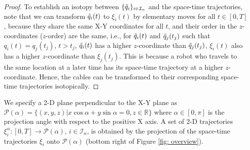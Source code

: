 \documentclass[conference]{IEEEtran}
\newcommand*{\myset}[1]{\mathcal{#1}} %
\newcommand*{\rone}{\mathbb{R}}
\newcommand*{\robpath}{q} %
\newcommand*{\ra}{\rightarrow} %
\newcommand*{\timet}{T} %
\newcommand*{\sptime}{\xi} %
\newcommand*{\pathfloor}{\Tilde{\robpath}} %
\newcommand*{\projang}{\alpha} %
\newcommand*{\projplane}{\myset{P}} %
\begin{document}
\begin{proof}
To establish an isotopy between $\{\pathfloor_i\}_{i\in\myset{I}_n}$ and the space-time trajectories, note that we can transform $\pathfloor_i(t)$ to $\sptime_i(t)$ by elementary moves for all $t\in[0,\timet]$, 
because they share the same X-Y coordinates for all $t$, and their order in the $z$-coordinates ($z$-order) are the same, i.e., for $\pathfloor_i(t)$ and $\pathfloor_j(t_j)$ such that $\robpath_i(t)=\robpath_j(t_j)$, $t>t_j$, $\pathfloor_i(t)$ has a higher $z$-coordinate than $\pathfloor_j(t_j)$, 
$\sptime_i(t)$ also has a higher $z$-coordinate than $\sptime_j(t_j)$. 
This is because a robot who travels to the same location at a later time has its space-time trajectory at a higher $z$-coordinate.
Hence, the cables can be transformed to their corresponding space-time trajectories isotopically.
\end{proof}

We specify a 2-D plane perpendicular to the X-Y plane as $\projplane(\projang)=\{(x,y,z)|x\cos\projang+y\sin\projang=0,z\in\rone\}$ where $\projang\in[0,\pi]$ is the projection angle with respect to the positive X axis. 
A set of 2-D trajectories 
$\sptime^{\projang}_{i}:[0,\timet]\ra\projplane(\projang)$, $i\in\myset{I}_n$, 
is obtained by the projection of the space-time trajectories $\sptime_i$ onto $\projplane(\projang)$ (bottom right of Figure \ref{fig: overview}).
\end{document}
